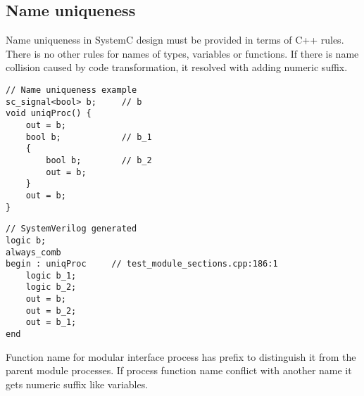 \subsection{Name uniqueness}\label{section:unique_gen}

Name uniqueness in SystemC design must be provided in terms of C++ rules. There is no other rules for names of types, variables or functions. If there is name collision caused by code transformation, it resolved with adding numeric suffix.

\begin{lstlisting}[style=mycpp]
// Name uniqueness example
sc_signal<bool> b;     // b
void uniqProc() {
    out = b;		
    bool b;            // b_1
    {
        bool b;        // b_2 
        out = b;
    }
    out = b;
}
\end{lstlisting}
%
\begin{lstlisting}[style=myverilog]
// SystemVerilog generated
logic b;
always_comb 
begin : uniqProc     // test_module_sections.cpp:186:1
    logic b_1;
    logic b_2;
    out = b;
    out = b_2;
    out = b_1;
end
\end{lstlisting}

Function name for modular interface process has prefix to distinguish it from the parent module processes. If process function name conflict with another name it gets numeric suffix like variables.




